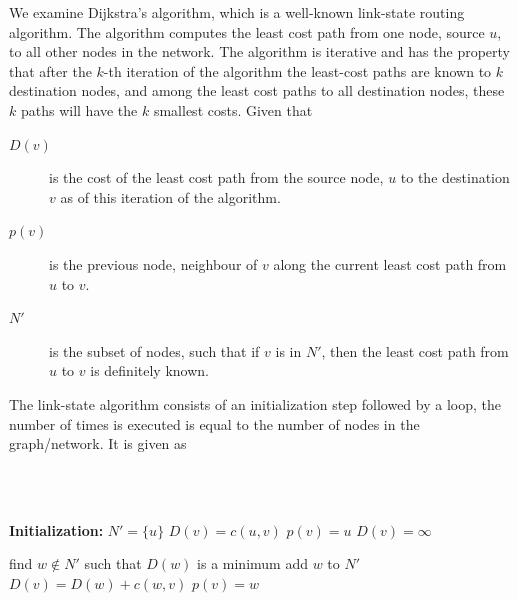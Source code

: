 \documentclass[12pt letter]{report}
\begin{document}
We examine Dijkstra's algorithm, which is a well-known link-state
routing algorithm. The algorithm computes the least cost path from
one node, source $u$, to all other nodes in the network. The
algorithm is iterative and has the property that after the $k$-th
iteration of the algorithm the least-cost paths are known to $k$
destination nodes, and among the least cost paths to all destination
nodes, these $k$ paths will have the $k$ smallest costs. Given that
\begin{description}
  \item[$D \left( v \right) $]  is the cost of the least cost path
    from the source node, $u$ to the destination $v$ as of this
    iteration of the algorithm.
  \item[$p \left( v \right) $] is the previous node, neighbour of $v$
    along the current least cost path from $u$ to $v$.
  \item[$N'$] is the subset of nodes, such that if $v$ is in $N'$,
    then the least cost path from $u$ to $v$ is definitely known.
\end{description}

The link-state algorithm consists of an initialization step followed
by a loop, the number of times is executed is equal to the number of
nodes in the graph/network. It is given as

\begin{algorithm}[H]
  \caption{Link-State (LS) Algorithm for Source Node $u$}
  \Comment{}\\
  \\
  \begin{algorithmic}[1]

    \State \textbf{Initialization:}
    \State $N' = \{ u \}$
    \State $D(v) = c(u, v)$
    \State $p(v) = u$
    \Else
    \State $D(v) = \infty$
    \EndIf
    \EndFor

    \State
    \State find $w \notin N'$ such that $D(w)$ is a minimum
    \State add $w$ to $N'$
    \State $D(v) = D(w) + c(w, v)$ 
    \State $p(v) = w$ 
    \EndIf
    \EndFor
    \EndWhile
  \end{algorithmic}
\end{algorithm}
\end{document}
